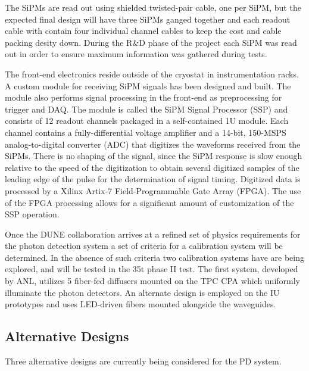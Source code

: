 The SiPMs are read out using shielded twisted-pair cable, one per SiPM,
but the expected final design will have three SiPMs ganged together and
each readout cable with contain four individual channel cables to keep
the cost and cable packing desity down. During the R\&D phase of the
project each SiPM was read out in order to ensure maximum information
was gathered during tests.  

The front-end electronics reside outside of the cryostat in
instrumentation racks. A custom module for receiving SiPM signals has
been designed and built. The module also performs signal processing in
the front-end as preprocessing for trigger and DAQ.  The module is
called the SiPM Signal Processor (SSP) and consists of 12 readout
channels packaged in a self-contained 1U module.  Each channel
contains a fully-differential voltage amplifier and a 14-bit, 150-MSPS
analog-to-digital converter (ADC) that digitizes the waveforms
received from the SiPMs. There is no shaping of the signal, since the
SiPM response is slow enough relative to the speed of the digitization
to obtain several digitized samples of the leading edge of the pulse
for the determination of signal timing. Digitized data is processed by
a Xilinx Artix-7 Field-Programmable Gate Array (FPGA).  The use of the
FPGA processing allows for a significant amount of customization of
the SSP operation. 

Once the DUNE collaboration arrives at a refined set of physics
requirements for the photon detection system a set of criteria for a
calibration system will be determined. In the absence of such criteria
two calibration systems have are being explored, and will be tested in
the 35t phase II test. The first system, developed by ANL, utilizes 5
fiber-fed diffusers mounted on the TPC CPA which uniformly illuminate
the photon detectors. An alternate design is employed on the IU
prototypes and uses LED-driven fibers mounted alongside the
waveguides. 

\subsection{Alternative Designs} 

Three alternative designs are currently being considered for the PD
system.

